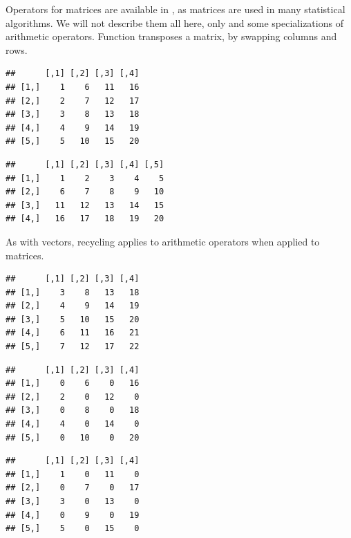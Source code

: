 \documentclass[krantz2]{krantz}\usepackage{knitr}
\begin{document}
Operators for matrices are available in \Rlang, as matrices are used in many statistical algorithms. We will not describe them all here, only  and some specializations of arithmetic operators. Function  transposes a matrix, by swapping columns and rows.

\begin{knitrout}\footnotesize
{}\color{fgcolor}\begin{kframe}
\begin{alltt}
 \hlkwb{<-} \hlstd{(}\hlopt{:}\hlstd{,}  \hlstd{=} \hlstd{)}
\end{alltt}
\begin{verbatim}
##      [,1] [,2] [,3] [,4]
## [1,]    1    6   11   16
## [2,]    2    7   12   17
## [3,]    3    8   13   18
## [4,]    4    9   14   19
## [5,]    5   10   15   20
\end{verbatim}
\begin{alltt}
\end{alltt}
\begin{verbatim}
##      [,1] [,2] [,3] [,4] [,5]
## [1,]    1    2    3    4    5
## [2,]    6    7    8    9   10
## [3,]   11   12   13   14   15
## [4,]   16   17   18   19   20
\end{verbatim}
\end{kframe}
\end{knitrout}

As with vectors, recycling applies to arithmetic operators when applied to matrices.

\begin{knitrout}\footnotesize
{}\color{fgcolor}\begin{kframe}
\begin{alltt}
 \hlopt{+} 
\end{alltt}
\begin{verbatim}
##      [,1] [,2] [,3] [,4]
## [1,]    3    8   13   18
## [2,]    4    9   14   19
## [3,]    5   10   15   20
## [4,]    6   11   16   21
## [5,]    7   12   17   22
\end{verbatim}
\begin{alltt}
 \hlopt{*} \hlopt{:}
\end{alltt}
\begin{verbatim}
##      [,1] [,2] [,3] [,4]
## [1,]    0    6    0   16
## [2,]    2    0   12    0
## [3,]    0    8    0   18
## [4,]    4    0   14    0
## [5,]    0   10    0   20
\end{verbatim}
\begin{alltt}
 \hlopt{*} \hlopt{:}
\end{alltt}
\begin{verbatim}
##      [,1] [,2] [,3] [,4]
## [1,]    1    0   11    0
## [2,]    0    7    0   17
## [3,]    3    0   13    0
## [4,]    0    9    0   19
## [5,]    5    0   15    0
\end{verbatim}
\end{kframe}
\end{knitrout}
\end{document}
